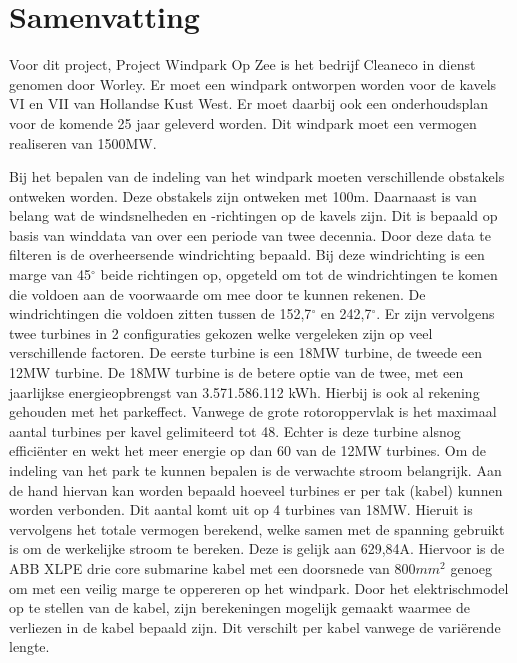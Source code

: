 \section{Samenvatting}
Voor dit project, Project Windpark Op Zee is het bedrijf Cleaneco in dienst genomen door Worley. 
Er moet een windpark ontworpen worden voor de kavels VI en VII van Hollandse Kust West. Er moet daarbij ook een onderhoudsplan voor de komende 25 jaar geleverd worden. Dit windpark moet een vermogen realiseren van 1500MW. 

Bij het bepalen van de indeling van het windpark moeten verschillende obstakels ontweken worden. Deze obstakels zijn ontweken met 100m. Daarnaast is van belang wat de windsnelheden en -richtingen op de kavels zijn. Dit is bepaald op basis van winddata van over een periode van twee decennia. Door deze data te filteren is de overheersende windrichting bepaald. Bij deze windrichting is een marge van 45$^{\circ}$ beide richtingen op, opgeteld om tot de windrichtingen te komen die voldoen aan de voorwaarde om mee door te kunnen rekenen. De windrichtingen die voldoen zitten tussen de 152,7$^{\circ}$ en 242,7$^{\circ}$. 
Er zijn vervolgens twee turbines in 2 configuraties gekozen welke vergeleken zijn op veel verschillende factoren. De eerste turbine is een 18MW turbine, de tweede een 12MW turbine. De 18MW turbine is de betere optie van de twee, met een jaarlijkse energieopbrengst van 3.571.586.112 kWh. Hierbij is ook al rekening gehouden met het parkeffect. Vanwege de grote rotoroppervlak is het maximaal aantal turbines per kavel gelimiteerd tot 48. Echter is deze turbine alsnog efficiënter en wekt het meer energie op dan 60 van de 12MW turbines. 
Om de indeling van het park te kunnen bepalen is de verwachte stroom belangrijk. Aan de hand hiervan kan worden bepaald hoeveel turbines er per tak (kabel) kunnen worden verbonden. Dit aantal komt uit op 4 turbines van 18MW. Hieruit is vervolgens het totale vermogen berekend, welke samen met de spanning gebruikt is om de werkelijke stroom te bereken. Deze is gelijk aan 629,84A. Hiervoor is de ABB XLPE drie core submarine kabel met een doorsnede van 800$mm^{2}$ genoeg om met een veilig marge te oppereren op het windpark. Door het elektrischmodel op te stellen van de kabel, zijn berekeningen mogelijk gemaakt waarmee de verliezen in de kabel bepaald zijn. Dit verschilt per kabel vanwege de variërende lengte. 

